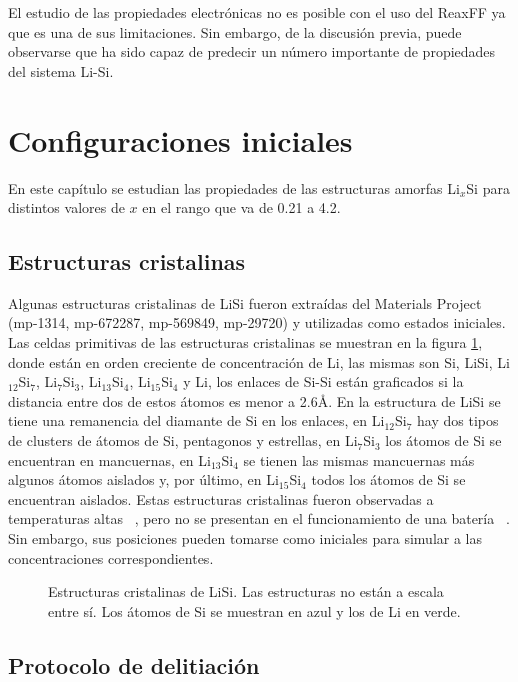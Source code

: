 El estudio de las propiedades electrónicas no es posible con el uso del ReaxFF ya
que es una de sus limitaciones. Sin embargo, de la discusión previa, puede 
observarse que ha sido capaz de predecir un número importante de propiedades del 
sistema Li-Si.


\section{Configuraciones iniciales}

En este capítulo se estudian las propiedades de las estructuras amorfas Li$_x$Si
para distintos valores de $x$ en el rango que va de 0.21 a 4.2.

\subsection{Estructuras cristalinas}

Algunas estructuras cristalinas de LiSi fueron extraídas del Materials Project
~\cite{materials_project} (mp-1314, mp-672287, mp-569849, mp-29720) y utilizadas 
como estados iniciales. Las celdas primitivas de las estructuras cristalinas se
muestran en la figura \ref{fig:cristalinas}, donde están en orden creciente de 
concentración de Li, las mismas son Si, LiSi, Li$_{12}$Si$_7$, Li$_7$Si$_3$, 
Li$_{13}$Si$_4$, Li$_{15}$Si$_4$ y Li, los enlaces de Si-Si están graficados
si la distancia entre dos de estos átomos es menor a 2.6\AA. En la estructura de 
LiSi se tiene una remanencia del diamante de Si en los enlaces, en Li$_{12}$Si$_7$
hay dos tipos de clusters de átomos de Si, pentagonos y estrellas, en Li$_7$Si$_3$ 
los átomos de Si se encuentran en mancuernas, en Li$_{13}$Si$_4$ se tienen las 
mismas mancuernas más algunos átomos aislados y, por último, en Li$_{15}$Si$_{4}$
todos los átomos de Si se encuentran aislados. Estas estructuras cristalinas
fueron observadas a temperaturas altas ~\cite{wen1981}, pero no se presentan en 
el funcionamiento de una batería ~\cite{obrovac2004}. Sin embargo, sus posiciones 
pueden tomarse como iniciales para simular a las concentraciones correspondientes.
\begin{figure}
    \centering
    \caption{Estructuras cristalinas de LiSi. Las estructuras no están a escala 
    entre sí. Los átomos de Si se muestran en azul y los de Li en verde.}
    \label{fig:cristalinas}
\end{figure}

\subsection{Protocolo de delitiación}


